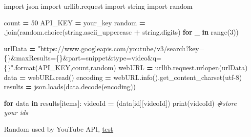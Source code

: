 \documentclass[
]{book}
\newenvironment{Shaded}{\begin{snugshade}}{\end{snugshade}}
\newcommand{\BuiltInTok}[1]{#1}
\newcommand{\CommentTok}[1]{\textcolor[rgb]{0.56,0.35,0.01}{\textit{#1}}}
\newcommand{\ControlFlowTok}[1]{\textcolor[rgb]{0.13,0.29,0.53}{\textbf{#1}}}
\newcommand{\DecValTok}[1]{\textcolor[rgb]{0.00,0.00,0.81}{#1}}
\newcommand{\ImportTok}[1]{#1}
\newcommand{\KeywordTok}[1]{\textcolor[rgb]{0.13,0.29,0.53}{\textbf{#1}}}
\newcommand{\NormalTok}[1]{#1}
\newcommand{\OperatorTok}[1]{\textcolor[rgb]{0.81,0.36,0.00}{\textbf{#1}}}
\newcommand{\SpecialCharTok}[1]{\textcolor[rgb]{0.00,0.00,0.00}{#1}}
\newcommand{\StringTok}[1]{\textcolor[rgb]{0.31,0.60,0.02}{#1}}
\begin{document}
\begin{Shaded}
\begin{Highlighting}[]
\ImportTok{import}\NormalTok{ json}
\ImportTok{import}\NormalTok{ urllib.request}
\ImportTok{import}\NormalTok{ string}
\ImportTok{import}\NormalTok{ random}

\NormalTok{count }\OperatorTok{=} \DecValTok{50}
\NormalTok{API\_KEY }\OperatorTok{=} \StringTok{\textquotesingle{}your\_key\textquotesingle{}}
\NormalTok{random }\OperatorTok{=} \StringTok{\textquotesingle{}\textquotesingle{}}\NormalTok{.join(random.choice(string.ascii\_uppercase }\OperatorTok{+}\NormalTok{ string.digits) }\ControlFlowTok{for}\NormalTok{ \_ }\KeywordTok{in} \BuiltInTok{range}\NormalTok{(}\DecValTok{3}\NormalTok{))}

\NormalTok{urlData }\OperatorTok{=} \StringTok{"https://www.googleapis.com/youtube/v3/search?key=}\SpecialCharTok{\{\}}\StringTok{\&maxResults=}\SpecialCharTok{\{\}}\StringTok{\&part=snippet\&type=video\&q=}\SpecialCharTok{\{\}}\StringTok{"}\NormalTok{.}\BuiltInTok{format}\NormalTok{(API\_KEY,count,random)}
\NormalTok{webURL }\OperatorTok{=}\NormalTok{ urllib.request.urlopen(urlData)}
\NormalTok{data }\OperatorTok{=}\NormalTok{ webURL.read()}
\NormalTok{encoding }\OperatorTok{=}\NormalTok{ webURL.info().get\_content\_charset(}\StringTok{\textquotesingle{}utf{-}8\textquotesingle{}}\NormalTok{)}
\NormalTok{results }\OperatorTok{=}\NormalTok{ json.loads(data.decode(encoding))}

\ControlFlowTok{for}\NormalTok{ data }\KeywordTok{in}\NormalTok{ results[}\StringTok{\textquotesingle{}items\textquotesingle{}}\NormalTok{]:}
\NormalTok{    videoId }\OperatorTok{=}\NormalTok{ (data[}\StringTok{\textquotesingle{}id\textquotesingle{}}\NormalTok{][}\StringTok{\textquotesingle{}videoId\textquotesingle{}}\NormalTok{])}
    \BuiltInTok{print}\NormalTok{(videoId)}
    \CommentTok{\#store your ids}
\end{Highlighting}
\end{Shaded}

Random used by YouTube API,
\href{https://developers.google.com/youtube/v3/docs/search/list?apix=true\&apix_params=\%7B\%22part\%22\%3A\%5B\%22snippet\%22\%5D\%2C\%22maxResults\%22\%3A25\%2C\%22q\%22\%3A\%22surfing\%22\%7D}{test}
\end{document}
